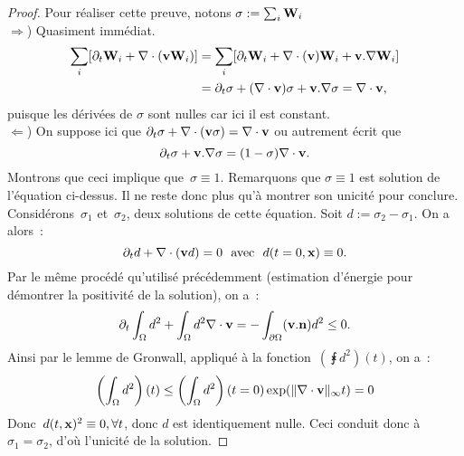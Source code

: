 \documentclass[main.tex]{subfiles}
\begin{document}
\begin{proof}
Pour réaliser cette preuve, notons $\sigma := \sum_i {\bf W}_i$ \\
$\Rightarrow$) Quasiment immédiat.
\begin{align*}
\sum_i  [ \partial_t {\bf W}_i + \nabla\cdot(\mathbf{v}{\bf W}_i) ] & = \sum_i  [ \partial_t {\bf W}_i + \nabla\cdot(\mathbf{v}) {\bf W}_i + \mathbf{v} . \nabla {\bf W}_i ] \\
& = \partial_t \sigma + (\nabla\cdot\mathbf{v}) \sigma + \mathbf{v} . \nabla \sigma = \nabla\cdot \mathbf{v},
\end{align*}
puisque les dérivées de $\sigma$  sont nulles car ici il est constant. \\
$\Leftarrow$) On suppose ici que $\partial_t \sigma + \nabla\cdot (\mathbf{v} \sigma ) = \nabla\cdot \mathbf{v}$ ou autrement écrit que $$ \partial_t \sigma + \mathbf{v} . \nabla \sigma  = (1-\sigma) \nabla\cdot \mathbf{v}.$$ Montrons que ceci implique que~$\sigma\equiv1$. Remarquons que $\sigma\equiv1$ est solution de l'équation ci-dessus. Il ne reste donc plus qu'à montrer son unicité pour conclure. Considérons~$\sigma_1$ et~$\sigma_2$, deux solutions de cette équation. Soit $d:=\sigma_2-\sigma_1$. On a alors~:
$$ \partial_t d + \nabla\cdot (\mathbf{v} d) = 0 \textrm{~~avec~~} d(t=0,\mathbf{x})\equiv0. $$
Par le même procédé qu'utilisé précédemment (estimation d'énergie pour démontrer la positivité de la solution), on a~:
\begin{equation}
\partial_t \int_\Omega d^2 + \int_\Omega d^2 \nabla\cdot \mathbf{v} = - \int_{\partial \Omega} (\mathbf{v} . {\bf n}) d^2 \leq 0.
\end{equation}
Ainsi par le lemme de Gronwall, appliqué à la fonction~$\left(\intx d^2 \right)(t)$, on a~:
\begin{equation}
\left(\int_\Omega d^2 \right)(t) \leq \left(\int_\Omega d^2 \right)(t=0) \exp ( \| \nabla\cdot \mathbf{v} \|_{\infty} t ) = 0
\end{equation}
Donc~$d(t,\mathbf{x})^2\equiv0, \forall t$, donc $d$ est identiquement nulle. Ceci conduit donc à~$\sigma_1=\sigma_2$, d'où l'unicité de la solution. 
\end{proof}
\end{document}
